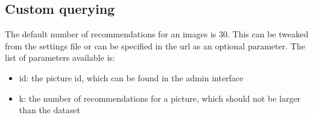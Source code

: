 \subsection{Custom querying}
\label{subsec:app_usage_querying}

The default number of recommendations for an images is 30. This can be tweaked from the settings file or can be specified in the url as an optional parameter. The list of parameters available is:

\begin{itemize}
\item{id: the picture id, which can be found in the admin interface}
\item{k: the number of recommendations for a picture, which should not be larger than the dataset}
\end{itemize}

